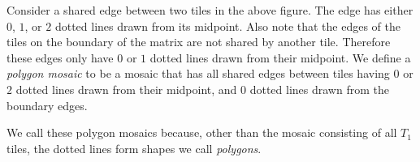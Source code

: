 \documentclass[12pt]{article}
\theoremstyle{plain}
\theoremstyle{definition}
\theoremstyle{remark}
\theoremstyle{definition}
\newcommand{\cell}[4]{ \draw[thick] ( #1 , #2 ) rectangle ( #3 , #4 );}
\newcommand{\cellA}[4]{ \draw[thick] ( #1 , #2 ) rectangle ( #3 , #4 ); \draw[red, thick, densely dotted] (#3 * 0.5 + #1 * 0.5 , #2) -- (#3, #4 * 0.5 + #2 * 0.5);}
\newcommand{\cellB}[4]{ \draw[thick] ( #1 , #2 ) rectangle ( #3 , #4 ); \draw[red, thick, densely dotted] (#3 * 0.5 + #1 * 0.5 , #2) -- (#1, #4 * 0.5 + #2 * 0.5);}
\newcommand{\cellC}[4]{ \draw[thick] ( #1 , #2 ) rectangle ( #3 , #4 ); \draw[red, thick, densely dotted] (#3 * 0.5 + #1 * 0.5 , #4) -- (#1, #4 * 0.5 + #2 * 0.5);}
\newcommand{\cellD}[4]{ \draw[thick] ( #1 , #2 ) rectangle ( #3 , #4 ); \draw[red, thick, densely dotted] (#3 * 0.5 + #1 * 0.5 , #4) -- (#3, #4 * 0.5 + #2 * 0.5);}
\newcommand{\cellE}[4]{ \draw[thick] ( #1 , #2 ) rectangle ( #3 , #4 ); \draw[red, thick, densely dotted] (#3 * 0.5 + #1 * 0.5 , #2) -- (#3 * 0.5 + #1 * 0.5 , #4);}
\newcommand{\cellF}[4]{ \draw[thick] ( #1 , #2 ) rectangle ( #3 , #4 ); \draw[red, thick, densely dotted] (#3, #4 * 0.5 + #2 * 0.5) -- (#1, #4 * 0.5 + #2 * 0.5);}
\begin{document}
\begin{center}
\end{center}

Consider a shared edge between two tiles in the above figure. The edge has either $0$, $1$, or $2$ dotted lines drawn from its midpoint. Also note that the edges of the tiles on the boundary of the matrix are not shared by another tile. Therefore these edges only have $0$ or $1$ dotted lines drawn from their midpoint. We define a \textit{polygon mosaic} to be a mosaic that has all shared edges between tiles having $0$ or $2$ dotted lines drawn from their midpoint, and $0$ dotted lines drawn from the boundary edges. 

We call these polygon mosaics because, other than the mosaic consisting of all $T_1$ tiles, the dotted lines form shapes we call \textit{polygons}. 
\end{document}
